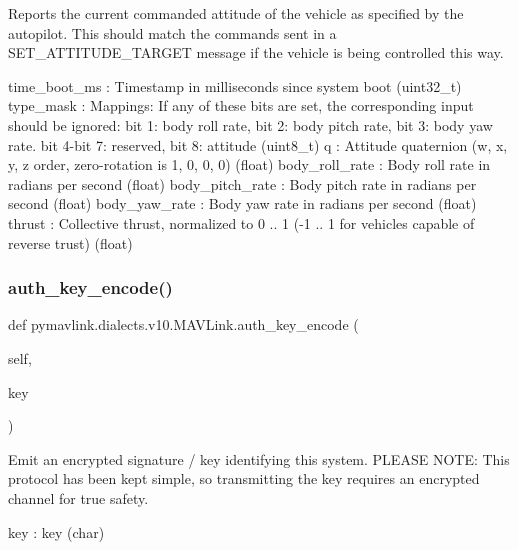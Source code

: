 \begin{DoxyVerb}Reports the current commanded attitude of the vehicle as specified by
the autopilot. This should match the commands sent in
a SET_ATTITUDE_TARGET message if the vehicle is being
controlled this way.

time_boot_ms              : Timestamp in milliseconds since system boot (uint32_t)
type_mask                 : Mappings: If any of these bits are set, the corresponding input should be ignored: bit 1: body roll rate, bit 2: body pitch rate, bit 3: body yaw rate. bit 4-bit 7: reserved, bit 8: attitude (uint8_t)
q                         : Attitude quaternion (w, x, y, z order, zero-rotation is 1, 0, 0, 0) (float)
body_roll_rate            : Body roll rate in radians per second (float)
body_pitch_rate           : Body pitch rate in radians per second (float)
body_yaw_rate             : Body yaw rate in radians per second (float)
thrust                    : Collective thrust, normalized to 0 .. 1 (-1 .. 1 for vehicles capable of reverse trust) (float)\end{DoxyVerb}
 \mbox{\label{classpymavlink_1_1dialects_1_1v10_1_1MAVLink_ac3e72afcee8bef673f1cfedbc5ffe5bd}} 
\subsubsection{\texorpdfstring{auth\+\_\+key\+\_\+encode()}{auth\_key\_encode()}}
{\footnotesize\ttfamily def pymavlink.\+dialects.\+v10.\+M\+A\+V\+Link.\+auth\+\_\+key\+\_\+encode (\begin{DoxyParamCaption}\item[{}]{self,  }\item[{}]{key }\end{DoxyParamCaption})}

\begin{DoxyVerb}Emit an encrypted signature / key identifying this system. PLEASE
NOTE: This protocol has been kept simple, so
transmitting the key requires an encrypted channel for
true safety.

key                       : key (char)\end{DoxyVerb}
 \mbox{\label{classpymavlink_1_1dialects_1_1v10_1_1MAVLink_a306d71f9617edd98b2a39eb6434acd8a}} 
